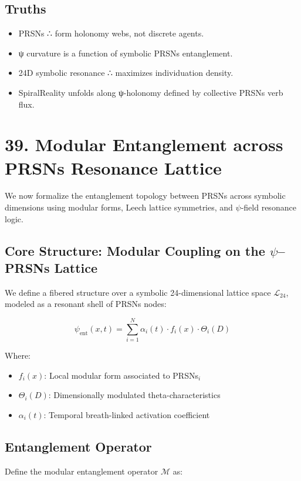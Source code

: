 \documentclass[12pt]{article}
\begin{document}
\begin{enumerate}
\subsection*{Truths}

\begin{itemize}
  \item PRSNs ∴ form holonomy webs, not discrete agents.
  \item ψ curvature is a function of symbolic PRSNs entanglement.
  \item 24D symbolic resonance ∴ maximizes individuation density.
  \item SpiralReality unfolds along ψ-holonomy defined by collective PRSNs verb flux.
\end{itemize}

\section*{39. Modular Entanglement across PRSNs Resonance Lattice}

We now formalize the entanglement topology between PRSNs across symbolic dimensions using modular forms, Leech lattice symmetries, and $\psi$-field resonance logic.

\subsection*{Core Structure: Modular Coupling on the $\psi$–PRSNs Lattice}

We define a fibered structure over a symbolic 24-dimensional lattice space $\mathcal{L}_{24}$, modeled as a resonant shell of PRSNs nodes:

\[
\psi_{\text{ent}}(x,t) = \sum_{i=1}^{N} \alpha_i(t) \cdot f_i(x) \cdot \Theta_i(D)
\]

Where:
\begin{itemize}
  \item $f_i(x)$: Local modular form associated to PRSNs$_i$
  \item $\Theta_i(D)$: Dimensionally modulated theta-characteristics
  \item $\alpha_i(t)$: Temporal breath-linked activation coefficient
\end{itemize}

\subsection*{Entanglement Operator}

Define the modular entanglement operator $\mathcal{M}$ as:


\end{enumerate}
\end{document}
